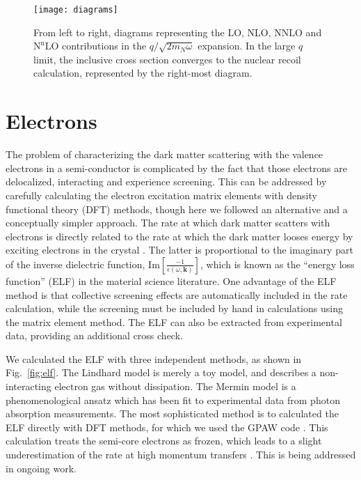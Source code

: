 \documentclass{moriond}
\begin{document}
\begin{figure}
\centerline{\texttt{[image: diagrams]}}
\caption[]{From left to right, diagrams representing the LO, NLO, $\mathrm{NNLO}$ and $\mathrm{N^nLO}$ contributions in the $q/\sqrt{2 m_N \omega}$ expansion. In the large $q$ limit, the inclusive cross section converges to the nuclear recoil calculation, represented by the right-most diagram.}
\label{fig:diagrams}
\end{figure}

\section{Electrons\label{sec:electrons}}
The problem of characterizing the dark matter scattering with the valence electrons in a semi-conductor is complicated by the fact that those electrons are delocalized, interacting and experience screening. This can be addressed by carefully calculating the electron excitation matrix elements with density functional theory (DFT) methods, though here we followed an alternative and a conceptually simpler approach. The rate at which dark matter scatters with electrons is directly related to the rate at which the dark matter looses energy by exciting electrons in the crystal \cite{Knapen:2021run,Hochberg:2021pkt}. The latter is proportional to the imaginary part of the inverse dielectric function, $\mathrm{Im}[\frac{-1}{\epsilon(\omega,\mathbf{k})}]$, which is known as the ``energy loss function'' (ELF) in the material science literature. One advantage of the ELF method is that collective screening effects are automatically included in the rate calculation, while the screening must be included by hand in calculations using the matrix element method. The ELF can also be extracted from experimental data, providing an additional cross check.

We calculated the ELF with three independent methods, as shown in Fig.~\ref{fig:elf}. The Lindhard model is merely a toy model, and describes a non-interacting electron gas without dissipation. The Mermin model is a phenomenological ansatz which has been fit to experimental data from photon absorption measurements. The most sophisticated method is to calculated the ELF directly with DFT methods, for which we used the GPAW code \cite{Enkovaara_2010}. This calculation treats the semi-core electrons as frozen, which leads to a slight underestimation of the rate at high momentum transfers \cite{Griffin:2021znd}. This is being addressed in ongoing work.
\end{document}
